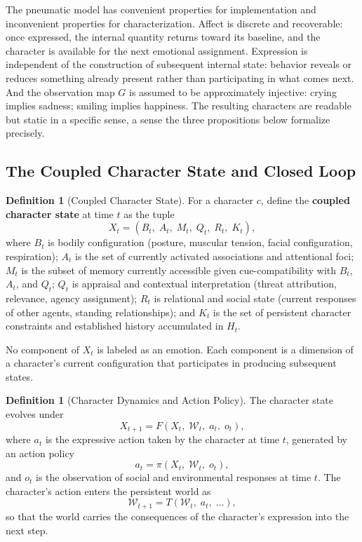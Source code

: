 \documentclass[11pt,a4paper]{article}
\theoremstyle{plain}
\theoremstyle{definition}
\newtheorem{definition}[theorem]{Definition}
\theoremstyle{remark}
\begin{document}
The pneumatic model has convenient properties for implementation and inconvenient properties for characterization. Affect is discrete and recoverable: once expressed, the internal quantity returns toward its baseline, and the character is available for the next emotional assignment. Expression is independent of the construction of subsequent internal state: behavior reveals or reduces something already present rather than participating in what comes next. And the observation map $G$ is assumed to be approximately injective: crying implies sadness; smiling implies happiness. The resulting characters are readable but static in a specific sense, a sense the three propositions below formalize precisely.

\subsection{The Coupled Character State and Closed Loop}

\begin{definition}[Coupled Character State]
For a character $c$, define the \textbf{coupled character state} at time $t$ as the tuple
\[
X_t = (B_t,\; A_t,\; M_t,\; Q_t,\; R_t,\; K_t),
\]
where $B_t$ is bodily configuration (posture, muscular tension, facial configuration, respiration); $A_t$ is the set of currently activated associations and attentional foci; $M_t$ is the subset of memory currently accessible given cue-compatibility with $B_t$, $A_t$, and $Q_t$; $Q_t$ is appraisal and contextual interpretation (threat attribution, relevance, agency assignment); $R_t$ is relational and social state (current responses of other agents, standing relationships); and $K_t$ is the set of persistent character constraints and established history accumulated in $H_t$.
\end{definition}

No component of $X_t$ is labeled as an emotion. Each component is a dimension of a character's current configuration that participates in producing subsequent states.

\begin{definition}[Character Dynamics and Action Policy]
The character state evolves under
\[
X_{t+1} = F(X_t,\; \mathcal{W}_t,\; a_t,\; o_t),
\]
where $a_t$ is the expressive action taken by the character at time $t$, generated by an action policy
\[
a_t = \pi(X_t,\; \mathcal{W}_t,\; o_t),
\]
and $o_t$ is the observation of social and environmental responses at time $t$. The character's action enters the persistent world as
\[
\mathcal{W}_{t+1} = T(\mathcal{W}_t,\; a_t,\; \ldots),
\]
so that the world carries the consequences of the character's expression into the next step.
\end{definition}
\end{document}
